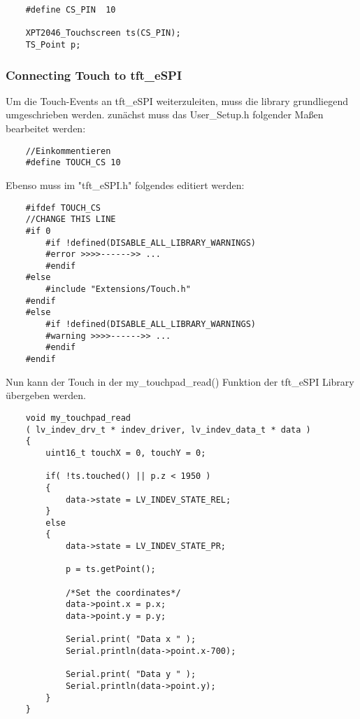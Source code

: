             \begin{lstlisting}
    #define CS_PIN  10

    XPT2046_Touchscreen ts(CS_PIN);
    TS_Point p;
            \end{lstlisting}

            \subsubsection{Connecting Touch to tft\_eSPI} \label{touch_to_tft}
            Um die Touch-Events an tft\_eSPI weiterzuleiten, muss die library grundliegend umgeschrieben werden.
            zunächst muss das User\_Setup.h folgender Maßen bearbeitet werden:

            \begin{lstlisting}
    //Einkommentieren
    #define TOUCH_CS 10 
            \end{lstlisting}

            
            \begin{minipage}{\linewidth}
            Ebenso muss im "tft\_eSPI.h" folgendes editiert werden:
            \begin{lstlisting}   
    #ifdef TOUCH_CS
    //CHANGE THIS LINE
    #if 0
        #if !defined(DISABLE_ALL_LIBRARY_WARNINGS)
        #error >>>>------>> ...
        #endif
    #else
        #include "Extensions/Touch.h"
    #endif
    #else
        #if !defined(DISABLE_ALL_LIBRARY_WARNINGS)
        #warning >>>>------>> ...
        #endif
    #endif
            \end{lstlisting}\end{minipage}
            
            

            \begin{minipage}{\linewidth}
            Nun kann der Touch in der my\_touchpad\_read() Funktion der tft\_eSPI Library
            übergeben werden.
            \begin{lstlisting}
    void my_touchpad_read
    ( lv_indev_drv_t * indev_driver, lv_indev_data_t * data )
    {
        uint16_t touchX = 0, touchY = 0;
    
        if( !ts.touched() || p.z < 1950 )
        {
            data->state = LV_INDEV_STATE_REL;
        }
        else
        {
            data->state = LV_INDEV_STATE_PR;
    
            p = ts.getPoint();

            /*Set the coordinates*/
            data->point.x = p.x;
            data->point.y = p.y;
    
            Serial.print( "Data x " );
            Serial.println(data->point.x-700);
    
            Serial.print( "Data y " );
            Serial.println(data->point.y);
        }
    }
            \end{lstlisting}\end{minipage}

